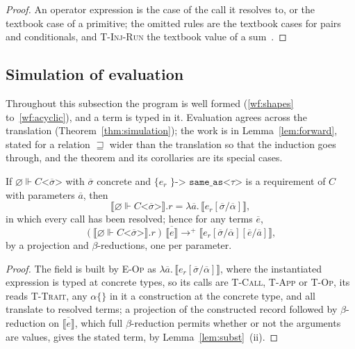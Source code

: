\begin{proof}
An operator expression is the case of the call it resolves to, or the textbook case of a primitive; the omitted rules are the textbook cases for pairs and conditionals, and \textsc{T-Inj-Run} the textbook value of a sum~\cite[Section~11.9]{pierce2002tapl}.
\end{proof}

\subsection{Simulation of evaluation}

Throughout this subsection the program is well formed (\ref{wf:shapes} to~\ref{wf:acyclic}), and a term is typed in it.
Evaluation agrees across the translation (Theorem~\ref{thm:simulation}); the work is in Lemma~\ref{lem:forward}, stated for a relation $\sqsupseteq$ wider than the translation so that the induction goes through, and the theorem and its corollaries are its special cases.

\begin{lemma}
\label{lem:resolve}
If $\varnothing \Vdash C\texttt{<}\overline{\sigma}\texttt{>}$ with $\overline{\sigma}$ concrete and $\texttt{\{ }e_r\texttt{ \} -> same\_as<}\tau\texttt{>}$ is a requirement of $C$ with parameters $\overline{a}$, then
\[ \llbracket \varnothing \Vdash C\texttt{<}\overline{\sigma}\texttt{>} \rrbracket.r = \lambda\overline{a}.\,\llbracket e_r[\overline{\sigma}/\overline{\alpha}] \rrbracket, \]
in which every call has been resolved; hence for any terms $\overline{e}$,
\[ (\llbracket \varnothing \Vdash C\texttt{<}\overline{\sigma}\texttt{>} \rrbracket.r)\,\overline{\llbracket e \rrbracket} \longrightarrow^{+} \llbracket e_r[\overline{\sigma}/\overline{\alpha}][\overline{e}/\overline{a}] \rrbracket, \]
by a projection and $\beta$-reductions, one per parameter.
\end{lemma}

\begin{proof}
The field is built by \textsc{E-Op} as $\lambda\overline{a}.\,\llbracket e_r[\overline{\sigma}/\overline{\alpha}] \rrbracket$, where the instantiated expression is typed at concrete types, so its calls are \textsc{T-Call}, \textsc{T-App} or \textsc{T-Op}, its reads \textsc{T-Trait}, any $\alpha\texttt{\{\}}$ in it a construction at the concrete type, and all translate to resolved terms; a projection of the constructed record followed by $\beta$-reduction on $\overline{\llbracket e \rrbracket}$, which full $\beta$-reduction permits whether or not the arguments are values, gives the stated term, by Lemma~\ref{lem:subst}~(ii).
\end{proof}

